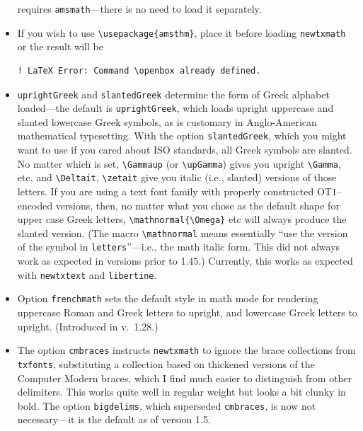 \documentclass[\fsc]{article}
\theoremstyle{oldplain}
\theoremstyle{plain}
\begin{document}
\begin{itemize}
requires  {\tt amsmath}---there is no need to load it separately.
\item If you wish to use \verb|\usepackage{amsthm}|, place it before loading {\tt newtxmath} or the result will  be
\begin{verbatim}
! LaTeX Error: Command \openbox already defined.
\end{verbatim}
\item {\tt uprightGreek} and {\tt slantedGreek} determine the form of Greek alphabet loaded---the default is {\tt uprightGreek}, which loads upright uppercase and slanted lowercase Greek symbols, as is customary in Anglo-American mathematical typesetting. With the option {\tt slantedGreek}, which you might want to use if you cared about ISO standards, all Greek symbols are slanted. No matter which is set, \verb|\Gammaup| (or \verb|\upGamma|) gives you upright \verb|\Gamma|, etc, and \verb|\Deltait|, \verb|\zetait| give you italic (i.e., slanted) versions of those letters. If you are using a text font family with properly constructed OT$1$--encoded versions, then, no matter what you chose as the default shape for upper case Greek letters, \verb|\mathnormal{\Omega}| etc will always produce the slanted version. (The macro \verb|\mathnormal| means essentially ``use the version of the symbol in {\tt letters}''---i.e., the math italic form. This did not always work as expected in versions prior to 1.45.) Currently, this works as expected with {\tt newtxtext} and {\tt libertine}. 
\item Option {\tt frenchmath} sets the default style in math mode for rendering uppercase Roman and Greek letters to upright, and lowercase Greek letters to upright. (Introduced in v.\ 1.28.)
\item The option {\tt cmbraces} instructs {\tt newtxmath} to ignore the brace collections from {\tt txfonts}, substituting a collection based on thickened versions of the Computer Modern braces, which I find much easier to distinguish from other delimiters. This works quite well in regular weight but looks a bit clunky in bold. The option {\tt bigdelims}, which superseded {\tt cmbraces}, is now not necessary---it is the default as of version 1.5.

\end{itemize}
\end{document}
